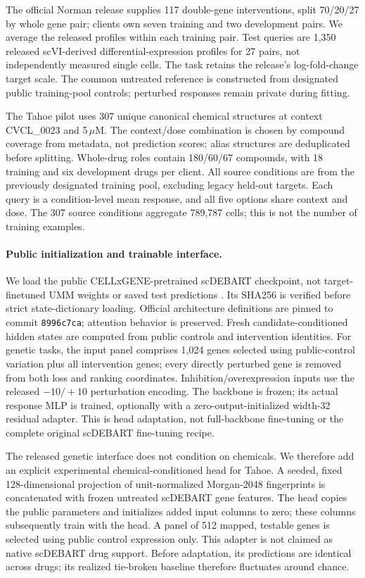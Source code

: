 The official Norman release supplies 117 double-gene interventions, split 70/20/27 by whole gene pair; clients own seven training and two development pairs. We average the released profiles within each training pair. Test queries are 1,350 released scVI-derived differential-expression profiles for 27 pairs, not independently measured single cells. The task retains the release's log-fold-change target scale. The common untreated reference is constructed from designated public training-pool controls; perturbed responses remain private during fitting.

The Tahoe pilot uses 307 unique canonical chemical structures at context CVCL\_0023 and 5\,$\mu$M. The context/dose combination is chosen by compound coverage from metadata, not prediction scores; alias structures are deduplicated before splitting. Whole-drug roles contain 180/60/67 compounds, with 18 training and six development drugs per client. All source conditions are from the previously designated training pool, excluding legacy held-out targets. Each query is a condition-level mean response, and all five options share context and dose. The 307 source conditions aggregate 789,787 cells; this is not the number of training examples.

\paragraph{Public initialization and trainable interface.}
We load the public CELLxGENE-pretrained scDEBART checkpoint, not target-finetuned UMM weights or saved test predictions \citep{sung2026scdebart}. Its SHA256 is verified before strict state-dictionary loading. Official architecture definitions are pinned to commit \texttt{8996c7ca}; attention behavior is preserved. Fresh candidate-conditioned hidden states are computed from public controls and intervention identities. For genetic tasks, the input panel comprises 1,024 genes selected using public-control variation plus all intervention genes; every directly perturbed gene is removed from both loss and ranking coordinates. Inhibition/overexpression inputs use the released $-10/+10$ perturbation encoding. The backbone is frozen; its actual response MLP is trained, optionally with a zero-output-initialized width-32 residual adapter. This is head adaptation, not full-backbone fine-tuning or the complete original scDEBART fine-tuning recipe.

The released genetic interface does not condition on chemicals. We therefore add an explicit experimental chemical-conditioned head for Tahoe. A seeded, fixed 128-dimensional projection of unit-normalized Morgan-2048 fingerprints is concatenated with frozen untreated scDEBART gene features. The head copies the public parameters and initializes added input columns to zero; these columns subsequently train with the head. A panel of 512 mapped, testable genes is selected using public control expression only. This adapter is not claimed as native scDEBART drug support. Before adaptation, its predictions are identical across drugs; its realized tie-broken baseline therefore fluctuates around chance.

